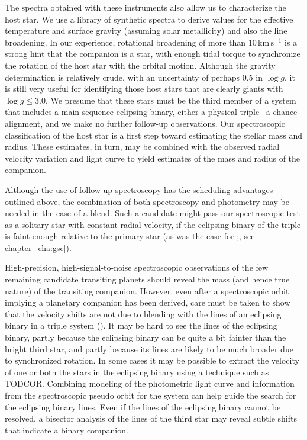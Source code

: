 The spectra obtained with these instruments also allow us to characterize the host star. We use a library of synthetic
spectra to derive values for the effective temperature and surface gravity (assuming solar metallicity) and also the
line broadening.  In our experience, rotational broadening of more than $10\,\mathrm{km\,s^{-1}}$ is a strong hint that
the companion is a star, with enough tidal torque to synchronize the rotation of the host star with the orbital motion.
Although the gravity determination is relatively crude, with an uncertainty of perhaps 0.5 in $\log{g}$, it is still
very useful for identifying those host stars that are clearly giants with $\log{g} \leq 3.0$.  We presume that these
stars must be the third member of a system that includes a main-sequence eclipsing binary, either a physical triple
\or\ a chance alignment, and we make no further follow-up observations. Our spectroscopic classification of the host star
is a first step toward estimating the stellar mass and radius. These estimates, in turn, may be combined with the
observed radial velocity variation and light curve to yield estimates of the mass and radius of the companion.

Although the use of follow-up spectroscopy has the scheduling advantages outlined above,
the combination of both spectroscopy and photometry may be needed in the case of a blend.
Such a candidate might pass our spectroscopic test as a solitary star with constant radial velocity,
if the eclipsing binary of the triple is faint enough relative to the primary star
(as was the case for \gscOTE;\@ \citealt{ODonovan_Charbonneau_Torres:apj:2006a}, see chapter~\ref{cha:gsc}).

High-precision, high-signal-to-noise spectroscopic observations of the few remaining candidate transiting planets should
reveal the mass (and hence true nature) of the transiting companion.
However, even after a spectroscopic orbit implying a planetary companion has been derived,
care must be taken to show that the velocity shifts are not due to blending with the lines of an eclipsing binary in a
triple system (\citealp[e.g.,][]{Mandushev_Torres_Latham:apj:2005a}). It may be hard to see the lines of the eclipsing%
binary, partly because the eclipsing binary can be quite a bit fainter than the bright third star, and partly because
its lines are likely to be much broader due to synchronized rotation.  In some cases it may be possible to extract the
velocity of one or both the stars in the eclipsing binary using a technique such as
TODCOR\@ \citep{Mandushev_Torres_Latham:apj:2005a}.
Combining modeling of the photometric light curve and information from the spectroscopic pseudo orbit for
the system can help guide the search for the eclipsing binary lines.
Even if the lines of the eclipsing binary cannot be resolved, a bisector analysis of the lines of the third star may
reveal subtle shifts that indicate a binary companion.

